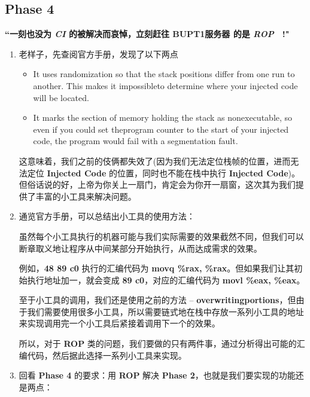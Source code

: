     \subsection{Phase 4}
        \par \textbf{``一刻也没为 \textit{CI} 的被解决而哀悼，立刻赶往 BUPT1服务器 的是 \textit{ROP \ }!"}
        \begin{enumerate}
            \item 老样子，先查阅官方手册，发现了以下两点
                \begin{itemize}
                    \item It uses randomization so that the stack positions differ from one run to another. This makes it impossibleto determine where your injected code will be located.
                    \item It marks the section of memory holding the stack as nonexecutable, so even if you could set theprogram counter to the start of your injected code, the program would fail with a segmentation fault.
                \end{itemize}
                \par 这意味着，我们之前的伎俩都失效了(因为我们无法定位栈帧的位置，进而无法定位 \textbf{Injected Code} 的位置，同时也不能在栈中执行 \textbf{Injected Code})。但俗话说的好，上帝为你关上一扇门，肯定会为你开一扇窗，这次其为我们提供了丰富的小工具来解决问题。
            \item 通览官方手册，可以总结出小工具的使用方法：
                \begin{mquote}
                    \par 虽然每个小工具执行的机器可能与我们实际需要的效果截然不同，但我们可以断章取义地让程序从中间某部分开始执行，从而达成需求的效果。
                    \par 例如，\textbf{48 89 c0} 执行的汇编代码为 \textbf{movq \%rax, \%rax}。但如果我们让其初始执行地址加一，就会变成 \textbf{89 c0}，对应的汇编代码为 \textbf{movl \%eax, \%eax}。
                    \par 至于小工具的调用，我们还是使用之前的方法 -- \textbf{overwritingportions}，但由于我们需要使用很多小工具，所以需要链式地在栈中存放一系列小工具的地址来实现调用完一个小工具后紧接着调用下一个的效果。
                    \par 所以，对于 \textbf{ROP} 类的问题，我们要做的只有两件事，通过分析得出可能的汇编代码，然后据此选择一系列小工具来实现。
                \end{mquote}
            \item 回看 \textbf{Phase 4} 的要求：用 \textbf{ROP} 解决 \textbf{Phase 2}，也就是我们要实现的功能还是两点：

\end{enumerate}
